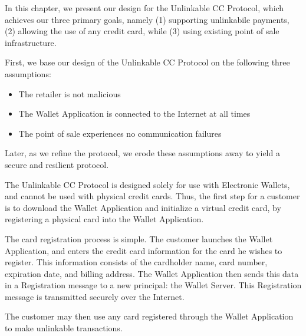 In this chapter, we present our design for the Unlinkable CC Protocol, which achieves our three primary goals, namely
    (1) supporting unlinkabile payments,
    (2) allowing the use of any credit card,
    while (3) using existing point of sale infrastructure.

First, we base our design of the Unlinkable CC Protocol on the following three assumptions:
\begin{itemize}
\item The retailer is not malicious
\item The Wallet Application is connected to the Internet at all times
\item The point of sale experiences no communication failures
\end{itemize}
Later, as we refine the protocol, we erode these assumptions away to yield a secure and resilient protocol.

The Unlinkable CC Protocol is designed solely for use with Electronic Wallets, and cannot be used with physical credit cards.
Thus, the first step for a customer is to download the Wallet Application and initialize a virtual credit card,
     by registering a physical card into the Wallet Application.

The card registration process is simple.
The customer launches the Wallet Application, and enters the credit card information for the card he wishes to register.
This information consists of the cardholder name, card number, expiration date, and billing address.
The Wallet Application then sends this data in a Registration message to a new principal: the Wallet Server.
This Registration message is transmitted securely over the Internet.

The customer may then use any card registered through the Wallet Application to make unlinkable transactions.
